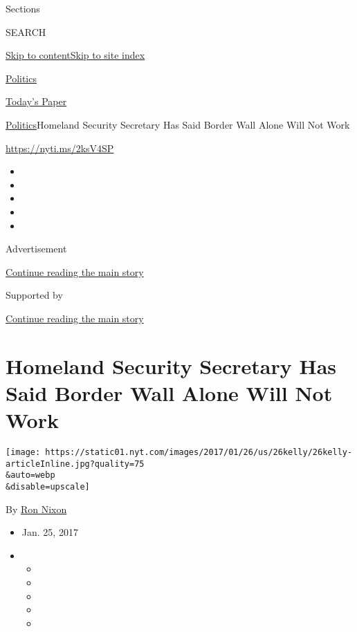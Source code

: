 Sections

SEARCH

\protect\hyperlink{site-content}{Skip to
content}\protect\hyperlink{site-index}{Skip to site index}

\href{https://www.nytimes.com/section/politics}{Politics}

\href{https://myaccount.nytimes.com/auth/login?response_type=cookie\&client_id=vi}{}

\href{https://www.nytimes.com/section/todayspaper}{Today's Paper}

\href{/section/politics}{Politics}\textbar{}Homeland Security Secretary
Has Said Border Wall Alone Will Not Work

\url{https://nyti.ms/2ksV4SP}

\begin{itemize}
\item
\item
\item
\item
\item
\end{itemize}

Advertisement

\protect\hyperlink{after-top}{Continue reading the main story}

Supported by

\protect\hyperlink{after-sponsor}{Continue reading the main story}

\hypertarget{homeland-security-secretary-has-said-border-wall-alone-will-not-work}{%
\section{Homeland Security Secretary Has Said Border Wall Alone Will Not
Work}\label{homeland-security-secretary-has-said-border-wall-alone-will-not-work}}

\texttt{[image: https://static01.nyt.com/images/2017/01/26/us/26kelly/26kelly-articleInline.jpg?quality=75\\\&auto=webp\\\&disable=upscale]}

By \href{http://www.nytimes.com/by/ron-nixon}{Ron Nixon}

\begin{itemize}
\item
  Jan. 25, 2017
\item
  \begin{itemize}
  \item
  \item
  \item
  \item
  \item
  \end{itemize}
\end{itemize}

